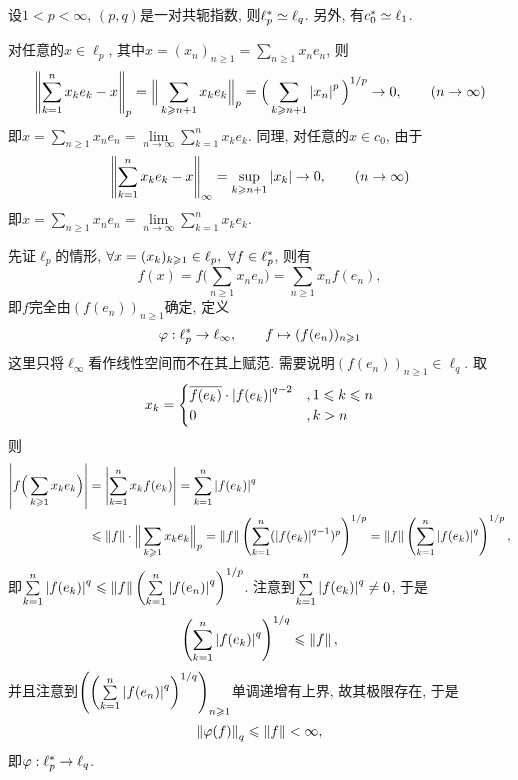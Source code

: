     \begin{Proposition}
        设$ 1<p<\infty $, $ (p,q) $是一对共轭指数, 则$ \ell_p^{*}\simeq\ell_q $. 另外, 有$ c_0^{*}\simeq\ell_1 $.
    \end{Proposition}
    \begin{Proof}
        对任意的$ x\in\ell_p $, 其中$ x=(x_n)_{n\geqslant 1}=\sum\limits_{n\geqslant 1}x_ne_n $, 则
        \[
        \left\| \sum_{k=1}^nx_ke_k-x \right\|_p=\Big\| \sum_{k\geqslant n+1}x_ke_k \Big\|_p=\Big(\sum_{k\geqslant n+1}\left| x_n \right| ^p\Big)^{1/p}\to 0,\qquad(n\to\infty)
        \]
        即$ x=\sum\limits_{n\geqslant 1}x_ne_n=\lim\limits_{n\to\infty}\sum\limits_{k=1}^nx_ke_k $. 同理, 对任意的$ x\in c_0 $, 由于
        \[
        \left\| \sum_{k=1}^nx_ke_k-x \right\|_\infty=\sup_{k\geqslant n+1}\left| x_k \right| \to 0,\qquad(n\to\infty)
        \]
        即$ x=\sum\limits_{n\geqslant 1}x_ne_n=\lim\limits_{n\to\infty}\sum\limits_{k=1}^nx_ke_k $.

        先证$ \ell_p $的情形, $ \forall x=(x_k)_{k\geqslant 1}\in\ell_p,\ \forall f\in\Star{\ell_p} $, 则有
        \[
        f(x)=f\Big( \sum_{n\geqslant 1}x_ne_n \Big)=\sum_{n\geqslant 1}x_nf(e_n),
        \]
        即$ f $完全由$ (f(e_n))_{n\geqslant 1} $确定, 定义
        \[
        \varphi : \ell_p^{*}\to\ell_\infty,\qquad f\mapsto(f(e_n))_{n\geqslant 1}
        \]
        这里只将$ \ell_\infty $看作线性空间而不在其上赋范. 需要说明$ (f(e_n))_{n\geqslant 1}\in\ell_q $. 取
        \[
        x_k=\begin{cases}
        \overline{f(e_k)}\cdot\left| f(e_k) \right| ^{q-2} & ,1\leqslant k\leqslant n\\
        0 & , k>n\\
        \end{cases}
        \]
        则
        \[
        \begin{aligned}
        \left| f\Big(\sum_{k\geqslant 1}x_ke_k\Big) \right| &=\left| \sum_{k=1}^nx_kf(e_k) \right| =\sum_{k=1}^n\left| f(e_k) \right| ^q\\
        &\leqslant\left\| f \right\|\cdot\Big\| \sum_{k\geqslant 1}x_ke_k \Big\|_p=\left\| f \right\|\left(\sum_{k=1}^n(\left| f(e_k) \right| ^{q-1})^p\right)^{1/p}=\left\| f \right\|\left(\sum_{k=1}^n\left| f(e_k) \right| ^q\right)^{1/p},
        \end{aligned}
        \]
        即$ \sum\limits_{k=1}^n\left| f(e_k) \right| ^q\leqslant\left\| f \right\|\left(\sum\limits_{k=1}^n\left| f(e_n) \right| ^q\right)^{1/p} $. 注意到$ \sum\limits_{k=1}^n\left| f(e_k) \right| ^q\ne 0 $, 于是
        \[
        \left(\sum_{k=1}^n\left| f(e_k) \right| ^q\right)^{1/q}\leqslant\left\| f \right\|,
        \]
        并且注意到$ \left(\left(\sum\limits_{k=1}^n\left| f(e_n) \right| ^q\right)^{1/q}\right)_{n\geqslant 1} $单调递增有上界, 故其极限存在, 于是
        \[
        \left\| \varphi(f) \right\|_q\leqslant\left\| f \right\|<\infty,
        \]
        即$ \varphi : \ell_p^{*}\to\ell_q $.


\end{Proof}
